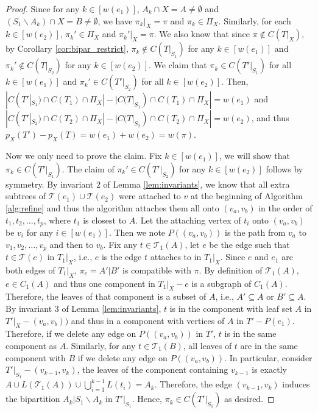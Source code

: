 \documentclass{bmcart}
\begin{document}
\begin{proof}
    Since for any $k \in [w(e_1)]$, $A_k \cap X = A \neq \emptyset$ and $(S_1 \backslash A_k) \cap X = B \neq \emptyset$, we have $\pi_k |_X = \pi$ and $\pi_k \in \Pi_X$. Similarly, for each $k \in [w(e_2)]$, $\pi_k' \in \Pi_X$ and $\pi_k'|_X = \pi$. We also know that since $\pi \notin C(T|_X)$, by Corollary \ref{cor:bipar_restrict}, $\pi_k \notin C(T|_{S_1})$ for any $k \in [w(e_1)]$ and $\pi_k' \notin C(T|_{S_2})$ for any $k \in [w(e_2)]$. We claim that $\pi_k \in C(T'|_{S_1})$ for all $k \in [w(e_1)]$ and $\pi_k' \in C(T'|_{S_2})$ for all $k \in [w(e_2)]$. Then, $|C(T'|_{S_1})\cap C(T_1) \cap \Pi_X| - |C(T|_{S_1})\cap C(T_1) \cap \Pi_X| = w(e_1)$ and $|C(T'|_{S_2}) \cap C(T_2) \cap \Pi_X| - |C(T|_{S_2}) \cap C(T_2) \cap \Pi_X| = w(e_2)$, and thus $p_X(T') - p_X(T) = w(e_1) + w(e_2) = w(\pi)$. \smallskip
    
    Now we only need to prove the claim. Fix $k \in [w(e_1)]$, we will show that $\pi_k \in C(T'|_{S_1})$. The claim of $\pi_k' \in C(T'|_{S_2})$ for any $k \in [w(e_2)]$ follows by symmetry.  By invariant $2$ of Lemma \ref{lem:invariants}, we know that all extra subtrees of $\mathcal{T}(e_1) \cup \mathcal{T}(e_2)$ were attached to $v$ at the beginning of Algorithm \ref{alg:refine} and thus the algorithm attaches them all onto $(v_a, v_b)$ in the order of $t_1,t_2,\dots,t_p$, where $t_1$ is closest to $A$. Let the attaching vertex of $t_i$ onto $(v_a, v_b)$ be $v_i$ for any $i \in [w(e_1)]$. Then we note $P( (v_a,v_b) )$ is the path from $v_a$ to $v_1,v_2,\dots, v_p$ and then to $v_b$. Fix any $t \in \mathcal{T}_1(A)$, let $e$ be the edge such that $t \in \mathcal{T}(e)$ in $T_1|_X$, i.e., $e$ is the edge $t$ attaches to in $T_1|_X$. Since $e$ and $e_1$ are both edges of $T_1|_X$, $\pi_e = A'|B'$ is compatible with $\pi$. By definition of $\mathcal{T}_1(A)$, $e \in C_1(A)$ and thus one component in $T_1|_X - e$ is a subgraph of $C_1(A)$. Therefore, the leaves of that component is a subset of $A$, i.e., $A' \subseteq A$ or $B' \subseteq A$. By invariant $3$ of Lemma \ref{lem:invariants}, $t$ is in the component with leaf set $A$ in $T'|_X - (v_a,v_b))$ and thus in a component with vertices of $A$ in $T'-P(e_1)$. Therefore, if we delete any edge on $P( (v_a,v_b) )$ in $T'$, $t$ is in the same component as $A$. Similarly, for any $t \in \mathcal{T}_1(B)$, all leaves of $t$ are in the same component with $B$ if we delete any edge on $P( (v_a,v_b) )$. In particular, consider $T'|_{S_1} - (v_{k-1}, v_k)$, the leaves of the component containing $v_{k-1}$ is exactly $A \cup L(\mathcal{T}_1(A)) \cup  \bigcup_{i = 1}^{k-1}L(t_i) = A_k$. Therefore, the edge $(v_{k-1},v_k)$ induces the bipartition $A_k | S_1 \backslash A_k$ in $T'|_{S_1}$. Hence, $\pi_k \in C(T'|_{S_1})$ as desired. 
\end{proof}
\end{document}
